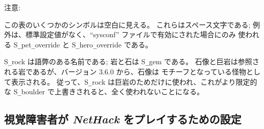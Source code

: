 注意:

この表のいくつかのシンボルは空白に見える。
これらはスペース文字である;
例外は、標準設定値がなく、``sysconf'' ファイルで有効にされた場合にのみ
使われる S\verb+_+pet\verb+_+override と
S\verb+_+hero\verb+_+override である。

S\verb+_+rock は語弊のある名前である; 岩と石は S\verb+_+gem である。
石像と巨岩は参照される岩であるが、バージョン 3.6.0 から、石像は
モチーフとなっている怪物として表示される。
従って、S\verb+_+rock は巨岩のためだけに使われ、これがより限定的な
S\verb+_+boulder で上書きされると、全く使われないことになる。

\subsection*{視覚障害者が {\it NetHack\/} をプレイするための設定}


